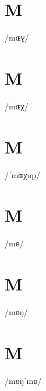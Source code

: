 \documentclass[10pt,a4paper,twoside]{book}
\begin{document}
\section*{M}

\begin{multicols}{3}
 {/mɶɣ/} {}
\end{multicols}

\section*{M}

\begin{multicols}{3}
 {/mɶχ/} {}
\end{multicols}

\section*{M}

\begin{multicols}{3}
 {/ˈmɶχup/} {}
\end{multicols}

\section*{M}

\begin{multicols}{3}
 {/mɵ/} {}
\end{multicols}

\section*{M}

\begin{multicols}{3}
 {/mɵŋ/} {}
\end{multicols}

\section*{M}

\begin{multicols}{3}
 {/mɵŋˈmɒ/} {}
\end{multicols}
\end{document}
